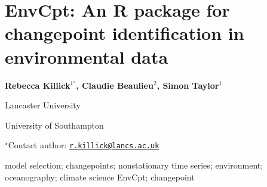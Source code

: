\documentclass[\main/boa.tex]{subfiles}
\begin{document}
\section{EnvCpt: An R package for changepoint identification in environmental
data}

\begin{center}
  {\bf {} Rebecca Killick$^{1^\star}$,  Claudie Beaulieu$^{2}$,  Simon Taylor$^{1}$}
\end{center}

\vskip 0.3cm

\begin{affiliations}
\begin{enumerate}
\begin{minipage}{0.915\textwidth}
\centering
\item Lancaster University \\[-2pt]
\item University of Southampton \\[-2pt]
\end{minipage}
\end{enumerate}
$^\star$Contact author: \href{mailto:r.killick@lancs.ac.uk}{\nolinkurl{r.killick@lancs.ac.uk}}\\
\end{affiliations}

\vskip 0.5cm

\begin{minipage}{0.915\textwidth}
\keywords model selection; changepoints; nonstationary time series; environment;
oceanography; climate science
\packages {} EnvCpt;  changepoint
\end{minipage}

\vskip 0.8cm
\end{document}
